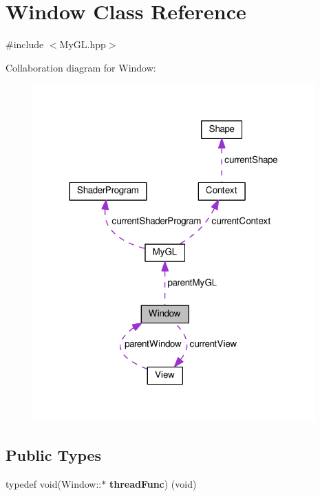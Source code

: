 \hypertarget{classWindow}{}\section{Window Class Reference}
\label{classWindow}


{\ttfamily \#include $<$My\+G\+L.\+hpp$>$}



Collaboration diagram for Window\+:\nopagebreak
\begin{figure}[H]
\begin{center}
\leavevmode
\includegraphics[width=307pt]{classWindow__coll__graph}
\end{center}
\end{figure}
\subsection*{Public Types}
\begin{DoxyCompactItemize}
\item 
typedef void(Window\+::$\ast$ {\bfseries thread\+Func}) (void)\hypertarget{classWindow_a1f4045bbf092073ad31043127af5e27d}{}\label{classWindow_a1f4045bbf092073ad31043127af5e27d}

\end{DoxyCompactItemize}
